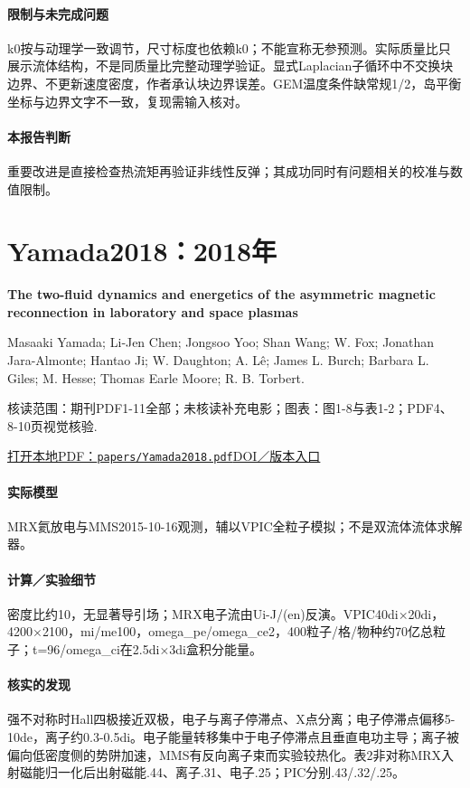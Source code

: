 \paragraph{限制与未完成问题}k0按与动理学一致调节，尺寸标度也依赖k0；不能宣称无参预测。实际质量比只展示流体结构，不是同质量比完整动理学验证。显式Laplacian子循环中不交换块边界、不更新速度密度，作者承认块边界误差。GEM温度条件缺常规1/2，岛平衡坐标与边界文字不一致，复现需输入核对。

\paragraph{本报告判断}重要改进是直接检查热流矩再验证非线性反弹；其成功同时有问题相关的校准与数值限制。

\section{Yamada2018：2018年}\label{paper:Yamada2018}

\textbf{The two-fluid dynamics and energetics of the asymmetric magnetic reconnection in laboratory and space plasmas}\citep{Yamada2018}\

Masaaki Yamada;  Li‐Jen Chen;  Jongsoo Yoo;  Shan Wang;  W. Fox;  Jonathan Jara-Almonte;  Hantao Ji;  W. Daughton;  A. Lê;  James L. Burch;  Barbara L. Giles;  M. Hesse;  Thomas Earle Moore;  R. B. Torbert.

\textsf{核读范围：}期刊PDF1-11全部；未核读补充电影；\textsf{图表：}图1-8与表1-2；PDF4、8-10页视觉核验.

\href{run:papers/Yamada2018.pdf}{打开本地PDF：\texttt{papers/Yamada2018.pdf}}\quad\href{https://doi.org/10.1038/s41467-018-07680-2}{DOI／版本入口}

\paragraph{实际模型}MRX氦放电与MMS2015-10-16观测，辅以VPIC全粒子模拟；不是双流体流体求解器。

\paragraph{计算／实验细节}密度比约10，无显著导引场；MRX电子流由Ui-J/(en)反演。VPIC40di×20di，4200×2100，mi/me100，omega\_pe/omega\_ce2，400粒子/格/物种约70亿总粒子；t=96/omega\_ci在2.5di×3di盒积分能量。

\paragraph{核实的发现}强不对称时Hall四极接近双极，电子与离子停滞点、X点分离；电子停滞点偏移5-10de，离子约0.3-0.5di。电子能量转移集中于电子停滞点且垂直电功主导；离子被偏向低密度侧的势阱加速，MMS有反向离子束而实验较热化。表2非对称MRX入射磁能归一化后出射磁能.44、离子.31、电子.25；PIC分别.43/.32/.25。

